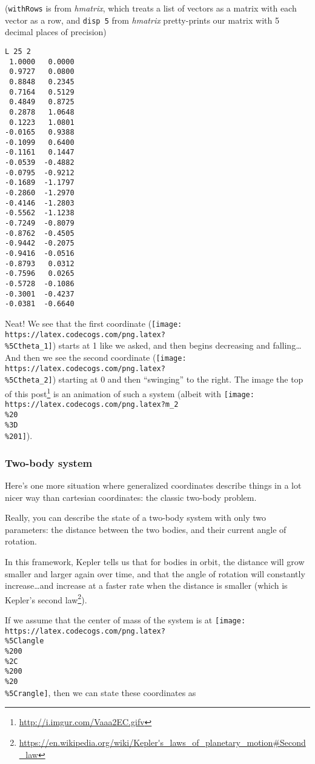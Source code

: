 \documentclass[]{article}
\renewcommand{\href}[2]{#2\footnote{\url{#1}}}
\begin{document}
(\texttt{withRows} is from \emph{hmatrix}, which treats a list of vectors as a
matrix with each vector as a row, and \texttt{disp\ 5} from \emph{hmatrix}
pretty-prints our matrix with 5 decimal places of precision)

\begin{verbatim}
L 25 2
 1.0000   0.0000
 0.9727   0.0800
 0.8848   0.2345
 0.7164   0.5129
 0.4849   0.8725
 0.2878   1.0648
 0.1223   1.0801
-0.0165   0.9388
-0.1099   0.6400
-0.1161   0.1447
-0.0539  -0.4882
-0.0795  -0.9212
-0.1689  -1.1797
-0.2860  -1.2970
-0.4146  -1.2803
-0.5562  -1.1238
-0.7249  -0.8079
-0.8762  -0.4505
-0.9442  -0.2075
-0.9416  -0.0516
-0.8793   0.0312
-0.7596   0.0265
-0.5728  -0.1086
-0.3001  -0.4237
-0.0381  -0.6640
\end{verbatim}

Neat! We see that the first coordinate
(\texttt{[image: https://latex.codecogs.com/png.latex?\\\%5Ctheta\_1]}) starts at 1
like we asked, and then begins decreasing and falling\ldots{} And then we see
the second coordinate
(\texttt{[image: https://latex.codecogs.com/png.latex?\\\%5Ctheta\_2]}) starting at
0 and then ``swinging'' to the right. The
\href{http://i.imgur.com/Vaaa2EC.gifv}{image the top of this post} is an
animation of such a system (albeit with
\texttt{[image: https://latex.codecogs.com/png.latex?m\_2\\\%20\\\%3D\\\%201]}).

\hypertarget{two-body-system}{%
\subsubsection{Two-body system}\label{two-body-system}}

Here's one more situation where generalized coordinates describe things in a lot
nicer way than cartesian coordinates: the classic two-body problem.

Really, you can describe the state of a two-body system with only two
parameters: the distance between the two bodies, and their current angle of
rotation.

In this framework, Kepler tells us that for bodies in orbit, the distance will
grow smaller and larger again over time, and that the angle of rotation will
constantly increase\ldots{}and increase at a faster rate when the distance is
smaller (which is
\href{https://en.wikipedia.org/wiki/Kepler's_laws_of_planetary_motion\#Second_law}{Kepler's
second law}).

If we assume that the center of mass of the system is at
\texttt{[image: https://latex.codecogs.com/png.latex?\\\%5Clangle\\\%200\\\%2C\\\%200\\\%20\\\%5Crangle]},
then we can state these coordinates as
\end{document}
